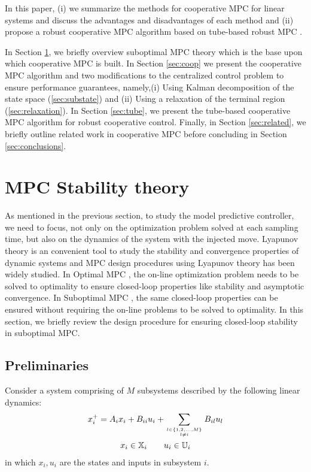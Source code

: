 \documentclass[10pt]{article}
\newcommand{\set}[1]{\left\lbrace #1 \right\rbrace}
\theoremstyle{definition}
\begin{document}
In this paper, (i) we summarize the methods for cooperative MPC for linear
systems and discuss the advantages and disadvantages of each method
and (ii) propose a robust cooperative MPC algorithm based on
tube-based robust MPC \citep[Chapter 3]{rawlings:mayne:2009}.


In Section \ref{sec:suboptimal}, we briefly overview suboptimal MPC
theory which is the base upon which cooperative MPC is built. In Section \ref{sec:coop} we present the cooperative MPC algorithm and two modifications to the centralized control problem to ensure performance guarantees,  namely,(i) Using Kalman decomposition of the state space (\ref{sec:substate})
and (ii) Using a relaxation of the terminal region
(\ref{sec:relaxation}). In Section \ref{sec:tube}, we present the
tube-based cooperative MPC algorithm for robust cooperative
control. Finally, in Section \ref{sec:related}, we briefly outline
related work in cooperative MPC before concluding in Section
\ref{sec:conclusions}.

\section{MPC Stability theory}
\label{sec:suboptimal}
As mentioned in the previous section, to study the model predictive controller, we need to focus, not only on the
optimization problem solved at each sampling time, but also on the
dynamics of the system with the injected move. Lyapunov theory is an
convenient tool to study the stability and convergence properties of
dynamic systems and MPC design procedures using Lyapunov theory has
been widely studied. In Optimal MPC \citep[Chapter
  2]{rawlings:mayne:2009}, the on-line optimization problem needs to
be solved to optimality to ensure closed-loop properties like
stability and asymptotic convergence. In Suboptimal MPC
\citep{pannocchia:rawlings:wright:2011,scokaert:mayne:rawlings:1999},
the same closed-loop properties can be ensured without requiring
the on-line problems to be solved to optimality. In this section, we briefly review the design procedure for ensuring
closed-loop stability in suboptimal MPC.
 
\subsection{Preliminaries}
Consider a system comprising of $M$ subsystems described by the
following linear dynamics: 
\begin{gather}
\label{eq:mpc:distributed:dynamics}
x_i^+ = A_i x_i + B_{ii} u_i + \sum_{l \in \set{1,2,\ldots,M} \atop l \neq i}
B_{il} u_l \\
x_i \in \mathbb{X}_i \qquad u_i \in
\mathbb{U}_i \label{eq:mpc:distributed:constraints} 
\end{gather}
in which $x_i,u_i$ are the states and inputs in subsystem $i$.
\end{document}
